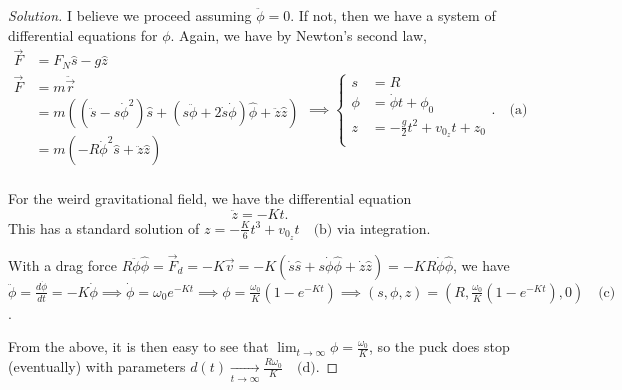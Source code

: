 \documentclass{article}
\theoremstyle{norm}
\begin{document}
\begin{proof}[Solution]
I believe we proceed assuming $\ddot{\phi} = 0$. If not, then we have a
system of differential equations for $\phi$. Again, we have by
Newton's second law,
\[ \begin{aligned}
\vec{F} &= F_N \hat{s} - g \hat{z} \\
\vec{F} &= m \ddot{\vec{r}} \\
&= m \left(\left( \ddot{s} - s \dot{\phi}^2 \right) \hat{s} + \left(s
\ddot{\phi} + 2 \dot{s} \dot{\phi}\right) \hat{\phi} + \ddot{z}
\hat{z}\right) \\
&= m\left(-R \dot{\phi}^2 \hat{s} + \ddot{z} \hat{z}\right) \\
\end{aligned} \implies \boxed{\left \lbrace \begin{aligned}
s &= R \\
\phi &= \dot{\phi} t + \phi_0 \\
z &= -\frac{g}{2} t^2 + v_{0_z} t + z_0 \\
\end{aligned} \right.}. \quad \textrm{(a)} \]

For the weird gravitational field, we have the differential equation
\[ \ddot{z} = -Kt. \]
This has a standard solution of $\boxed{z = -\frac{K}{6} t^3 + v_{0_z}
t} \quad \textrm{(b)}$ via integration.

With a drag force $R \ddot{\phi} \hat{\phi} = \vec{F}_d = -K \vec{v} =
-K (\dot{s} \hat{s} + s \dot{\phi} \hat{\phi} + \dot{z} \hat{z}) = -KR
\dot{\phi}\hat{\phi}$, we have $\ddot{\phi} = \frac{d \dot{\phi}}{dt} =
-K \dot{\phi} \implies \dot{\phi} = \omega_0 e^{-K t} \implies \phi =
\frac{\omega_0}{K} \left(1 - e^{-Kt}\right) \implies \boxed{(s, \phi, z)
= \left(R, \frac{\omega_0}{K}\left(1 - e^{-Kt}\right), 0\right)} \quad
\textrm{(c)}$.

From the above, it is then easy to see that $\lim_{t \to \infty} \phi =
\frac{\omega_0}{K}$, so the puck does stop (eventually) with parameters
$\boxed{d(t) \xrightarrow[t \to \infty]{} \frac{R \omega_0}{K}} \quad
\textrm{(d)}$.
\end{proof}
\end{document}
